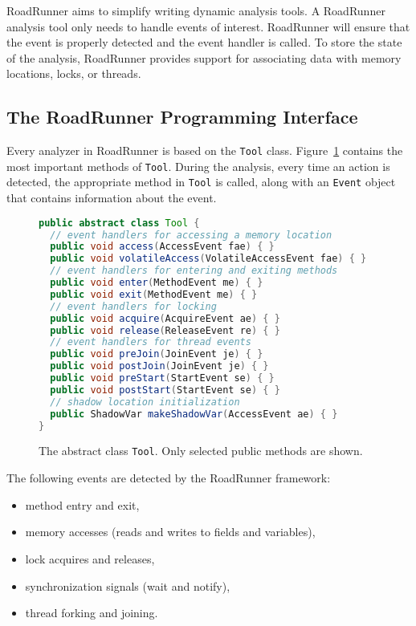 RoadRunner aims to simplify writing dynamic analysis tools. A RoadRunner
analysis tool only needs to handle events of interest. RoadRunner will ensure
that the event is properly detected and the event handler is called. To store
the state of the analysis, RoadRunner provides support for associating data with
memory locations, locks, or threads.

\subsection{The RoadRunner Programming Interface}

Every analyzer in RoadRunner is based on the \texttt{Tool} class.
Figure~\ref{toolclass} contains the most important methods of \texttt{Tool}.
During the analysis, every time an action is detected, the appropriate method in
\texttt{Tool} is called, along with an \texttt{Event} object that contains
information about the event.

\begin{figure}[hbt]
    \label{toolclass}
    \begin{lstlisting}[language=java]
public abstract class Tool {
  // event handlers for accessing a memory location
  public void access(AccessEvent fae) { }
  public void volatileAccess(VolatileAccessEvent fae) { }
  // event handlers for entering and exiting methods
  public void enter(MethodEvent me) { }
  public void exit(MethodEvent me) { }
  // event handlers for locking
  public void acquire(AcquireEvent ae) { }
  public void release(ReleaseEvent re) { }
  // event handlers for thread events
  public void preJoin(JoinEvent je) { }
  public void postJoin(JoinEvent je) { }
  public void preStart(StartEvent se) { }
  public void postStart(StartEvent se) { }
  // shadow location initialization
  public ShadowVar makeShadowVar(AccessEvent ae) { }
}
    \end{lstlisting}
    \caption{The abstract class \texttt{Tool}. Only selected public methods are
    shown.}
\end{figure}

The following events are detected by the RoadRunner framework:
\begin{itemize}
    \item method entry and exit,
    \item memory accesses (reads and writes to fields and variables),
    \item lock acquires and releases,
    \item synchronization signals (wait and notify),
    \item thread forking and joining.
\end{itemize}

